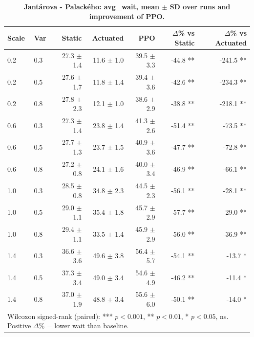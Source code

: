 \begin{table}
\caption{\textbf{Jantárova - Palackého: avg\_wait, mean $\pm$ SD over runs and improvement of PPO.}}
\label{tab:stats_Jantárova_-_Palackého_avg_wait}
\centering
\begin{tabular}{llrrrrr}
\hline
Scale & Var & Static & Actuated & PPO & $\Delta$\% vs Static & $\Delta$\% vs Actuated \\
\hline
0.2 & 0.3 & 27.3 $\pm$ 1.4 & 11.6 $\pm$ 1.0 & 39.5 $\pm$ 3.3 & -44.8 ** & -241.5 ** \\
0.2 & 0.5 & 27.6 $\pm$ 1.7 & 11.8 $\pm$ 1.4 & 39.4 $\pm$ 3.6 & -42.6 ** & -234.3 ** \\
0.2 & 0.8 & 27.8 $\pm$ 2.3 & 12.1 $\pm$ 1.0 & 38.6 $\pm$ 2.9 & -38.8 ** & -218.1 ** \\
0.6 & 0.3 & 27.3 $\pm$ 1.4 & 23.8 $\pm$ 1.4 & 41.3 $\pm$ 2.6 & -51.4 ** & -73.5 ** \\
0.6 & 0.5 & 27.7 $\pm$ 1.3 & 23.7 $\pm$ 1.5 & 40.9 $\pm$ 3.6 & -47.7 ** & -72.8 ** \\
0.6 & 0.8 & 27.2 $\pm$ 0.8 & 24.1 $\pm$ 1.6 & 40.0 $\pm$ 3.4 & -46.9 ** & -66.1 ** \\
1.0 & 0.3 & 28.5 $\pm$ 0.8 & 34.8 $\pm$ 2.3 & 44.5 $\pm$ 2.3 & -56.1 ** & -28.1 ** \\
1.0 & 0.5 & 29.0 $\pm$ 1.1 & 35.4 $\pm$ 1.8 & 45.7 $\pm$ 2.9 & -57.7 ** & -29.0 ** \\
1.0 & 0.8 & 29.4 $\pm$ 1.1 & 33.5 $\pm$ 1.4 & 45.9 $\pm$ 2.9 & -56.0 ** & -36.9 ** \\
1.4 & 0.3 & 36.6 $\pm$ 3.6 & 49.6 $\pm$ 3.8 & 56.4 $\pm$ 5.7 & -54.1 ** & -13.7 * \\
1.4 & 0.5 & 37.3 $\pm$ 3.4 & 49.0 $\pm$ 3.4 & 54.6 $\pm$ 4.9 & -46.2 ** & -11.4 * \\
1.4 & 0.8 & 37.0 $\pm$ 1.9 & 48.8 $\pm$ 3.4 & 55.6 $\pm$ 6.0 & -50.1 ** & -14.0 * \\
\hline
\multicolumn{7}{l}{\footnotesize Wilcoxon signed-rank (paired): *** $p<0.001$, ** $p<0.01$, * $p<0.05$, ns. Positive $\Delta$\% = lower wait than baseline.} \\
\end{tabular}
\end{table}
